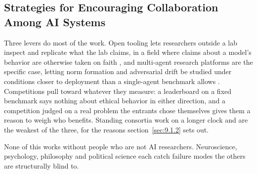 \subsection{Strategies for Encouraging Collaboration Among AI Systems}
\label{sec:5.5.2}
Three levers do most of the work. Open tooling lets researchers outside a lab inspect and replicate what the lab claims, in a field where claims about a model's behavior are otherwise taken on faith \autocite{wolf2020transformers}, and multi-agent research platforms are the specific case, letting norm formation and adversarial drift be studied under conditions closer to deployment than a single-agent benchmark allows \autocite{leibo2021meltingpot}. Competitions pull toward whatever they measure: a leaderboard on a fixed benchmark says nothing about ethical behavior in either direction, and a competition judged on a real problem the entrants chose themselves gives them a reason to weigh who benefits. Standing consortia work on a longer clock and are the weakest of the three, for the reasons section~\ref{sec:9.1.2} sets out.

None of this works without people who are not AI researchers. Neuroscience, psychology, philosophy and political science each catch failure modes the others are structurally blind to.
